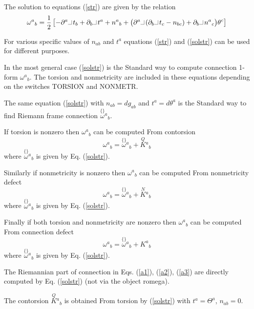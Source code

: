 \documentclass[twoside,openright]{report}
\newcommand{\grgtt}{\ttfamily}
\newcommand{\rim}[1]{\stackrel{\scriptscriptstyle\{\}}{#1}\!}
\newcommand{\ipr}{\rule{1.8mm}{.1mm}\rule{.1mm}{2.2mm}\,} %
\renewcommand{\tt}{\grgtt}
\newcommand{\comm}[1]{{\upshape\tt#1}}    %
\begin{document}
The solution to equations (\ref{str}) are given by the relation
\begin{equation}
\omega^a{}_b =
\frac{1}{2}\left[ -\partial^a\ipr t_b + \partial_b\ipr t^a + n^a{}_b
+\big(\partial^a\ipr(\partial_b\ipr t_c-n_{bc})
+\partial_b\ipr n^a{}_c\big)\theta^c\right] \label{solstr}
\end{equation}

For various specific values of $n_{ab}$ and $t^a$ equations
(\ref{str}) and (\ref{solstr}) can be used for different purposes.

In the most general case (\ref{solstr}) is the {\tt Standard way} to
compute connection 1-form $\omega^a{}_b$.
The torsion and nonmetricity are included in
these equations depending on the switches \comm{TORSION} and
\comm{NONMETR}.

The same equation (\ref{solstr}) with $n_{ab}=dg_{ab}$ and
$t^a=d\theta^a$ is the {\tt Standard way} to find Riemann
frame connection $\rim{\omega}{}^a{}_b$.

If torsion is nonzero then $\omega^a{}_b$ can be computed
{\tt From contorsion}
\begin{equation}
\omega^a{}_b = \rim{\omega}{}^a{}_b
+ \stackrel{\scriptscriptstyle Q}{K}\!{}^a{}_b  \label{a1}
\end{equation}
where $\rim{\omega}{}^a{}_b$ is given by Eq. (\ref{solstr}).

Similarly if nonmetricity is nonzero then $\omega^a{}_b$ can be computed
{\tt From nonmetricity defect}
\begin{equation}
\omega^a{}_b = \rim{\omega}{}^a{}_b
+ \stackrel{\scriptscriptstyle N}{K}\!{}^a{}_b   \label{a2}
\end{equation}
where $\rim{\omega}{}^a{}_b$ is given by Eq. (\ref{solstr}).

Finally if both torsion and nonmetricity are
nonzero then $\omega^a{}_b$ can be computed
{\tt From connection defect}
\begin{equation}
\omega^a{}_b = \rim{\omega}{}^a{}_b + K^a{}_b   \label{a3}
\end{equation}
where $\rim{\omega}{}^a{}_b$ is given by Eq. (\ref{solstr}).

The Riemannian part of connection in Eqs. (\ref{a1}),
(\ref{a2}), (\ref{a3}) are directly computed by Eq. (\ref{solstr})
(not via the object \comm{romega}).

The contorsion $\stackrel{\scriptscriptstyle Q}{K}\!{}^a{}_b$
is obtained {\tt From torsion} by (\ref{solstr})
with $t^a=\Theta^a$, $n_{ab}=0$.
\end{document}
